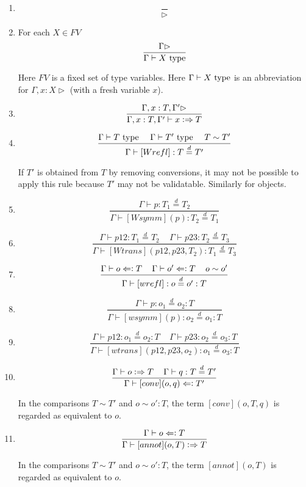 \documentclass[11pt]{article}
\newcommand{\eqd}{\stackrel{d}{=}}
\newcommand{\spc}{{\,\,\,\,\,\,\,}}
\newcommand{\synth}{\vcentcolon\Rightarrow}
\newcommand{\force}{\Leftarrow\vcentcolon}
\newcommand{\Type}{\mathop{{\, \rm type}}}
\begin{document}
\begin{enumerate}

\item 
$$\frac{}{\rhd}$$

\item For each $X\in FV$
$$\frac{\Gamma\rhd}{\Gamma\vdash X \Type}$$

Here $FV$ is a fixed set of type variables.  Here $\Gamma\vdash X \Type$
is an abbreviation for $\Gamma, x:X\rhd$ (with a fresh variable $x$).

\item 
$$\frac{\Gamma, x:T, \Gamma'\rhd}{\Gamma, x:T, \Gamma'\vdash x \synth T}$$

\item 
$$\frac{\Gamma \vdash T \Type\spc \Gamma \vdash T'\Type \spc T\sim T'}{\Gamma\vdash [Wrefl]: T\eqd T'}$$

If $T'$ is obtained from $T$ by removing conversions, it may not be possible to apply
this rule because $T'$ may not be validatable.  Similarly for objects.

\item 
$$\frac{\Gamma\vdash p:T_1\eqd T_2}{\Gamma\vdash [Wsymm](p):T_2\eqd T_1}$$

\item 
$$\frac{\Gamma\vdash p12:T_1\eqd T_2\spc\Gamma\vdash p23:T_2\eqd T_3}{\Gamma\vdash [Wtrans](p12,p23,T_2): T_1\eqd T_3}$$

\item 
$$\frac{\Gamma\vdash o \force T\spc\Gamma\vdash o' \force T \spc o \sim o'}{\Gamma\vdash [wrefl]:o\eqd o':T}$$

\item 
$$\frac{\Gamma\vdash p:o_1\eqd o_2:T}{\Gamma\vdash [wsymm](p):o_2\eqd o_1:T}$$

\item 
$$\frac{\Gamma\vdash p12:o_1\eqd o_2:T\spc\Gamma\vdash p23:o_2\eqd o_3:T}{\Gamma\vdash [wtrans](p12,p23,o_2):o_1\eqd o_3:T}$$

\item 
$$\frac{\Gamma\vdash o \synth T\spc \Gamma\vdash q : T\eqd T'}{\Gamma\vdash [conv](o,q) \force T'}$$

In the comparisons $T\sim T'$ and $o\sim o':T$, the term $[conv](o,T,q)$ is regarded as equivalent to $o$.

\item 
$$\frac{\Gamma\vdash o \force T}{\Gamma\vdash [annot](o,T) \synth T}$$

In the comparisons $T\sim T'$ and $o\sim o':T$, the term $[annot](o,T)$ is regarded as equivalent to $o$.

\end{enumerate}
\end{document}
